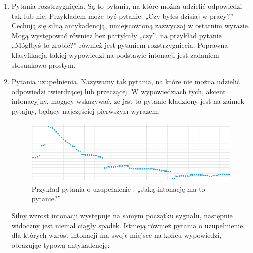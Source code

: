 \documentclass[a4paper,12 pt]{article}
\begin{document}
\begin{enumerate}
\item Pytania rozstrzygnięcia. Są to pytania, na które można udzielić odpowiedzi tak lub nie. Przykładem może być pytanie: „Czy byłeś dzisiaj w pracy?”  Cechują się silną antykadencją, umiejscowioną zazwyczaj w ostatnim wyrazie. Mogą występować również bez partykuły „czy”, na przykład pytanie „Mógłbyś to zrobić?” również jest pytaniem rozstrzygnięcia. Poprawna klasyfikacja takiej wypowiedzi na podstawie intonacji jest zadaniem stosunkowo prostym.
\item Pytania uzupełnienia. Nazywamy tak pytania, na które nie można udzielić odpowiedzi twierdzącej lub przeczącej. W wypowiedziach tych, akcent intonacyjny, mogący wskazywać, ze jest to pytanie kładziony jest na zaimek pytajny, będący najczęściej pierwszym wyrazem.

\begin{figure}[h]

\centering
\includegraphics[scale=0.9]{pytanie_uzupelnienie.png}
\caption{Przykład pytania o uzupełnienie : „Jaką intonację ma to pytanie?”}

\end{figure}
\FloatBarrier
Silny wzrost intonacji występuje na samym początku sygnału, następnie widoczny jest niemal ciągły spadek.
Istnieją również pytania o uzupełnienie, dla których wzrost intonacji ma swoje miejsce na końcu wypowiedzi, obrazując typową antykadencję:
 \begin{enumerate}


\end{enumerate}
\end{enumerate}
\end{document}
